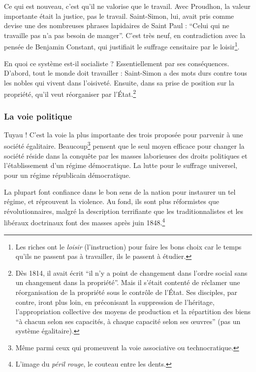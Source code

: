 \documentclass[12pt]{report}
\begin{document}
Ce qui est nouveau, c'est qu'il ne valorise que le travail. Avec Proudhon, la valeur importante était la justice, pas le travail. Saint-Simon, lui, avait pris comme devise une des nombreuses phrases lapidaires de Saint Paul : \enquote{Celui qui ne travaille pas n'a pas besoin de manger}.
C'est très neuf, en contradiction avec la pensée de Benjamin Constant, qui justifiait le suffrage censitaire par le loisir\footnote{Les riches ont le \emph{loisir} (l'instruction) pour faire les bons choix car le temps qu'ils ne passent pas à travailler, ils le passent à étudier.}.

En quoi ce système est-il socialiste ? Essentiellement par ses conséquences. D'abord, tout le monde doit travailler : Saint-Simon a des mots durs contre tous les nobles qui vivent dans l'oisiveté. Ensuite, dans sa prise de position sur la propriété, qu'il veut réorganiser par l'État.\footnote{Dès 1814, il avait écrit \enquote{il n'y a point de changement dans l'ordre social sans un changement dans la propriété}. Mais il s'était contenté de réclamer une réorganisation de la propriété sous le contrôle de l'État. Ses disciples, par contre, iront plus loin, en préconisant la suppression de l'héritage, l'appropriation collective des moyens de production et la répartition des biens \enquote{à chacun selon ses capacités, à chaque capacité selon ses œuvres} (pas un système égalitaire).}

\subsubsection{La voie politique}

Tuyau ! C'est la voie la plus importante des trois proposée pour parvenir à une société égalitaire.
Beaucoup\footnote{Même parmi ceux qui promeuvent la voie associative ou technocratique.} pensent que le seul moyen efficace pour changer la société réside dans la conquête par les masses laborieuses des droits politiques et l'établissement d'un régime démocratique. La lutte pour le suffrage universel, pour un régime républicain démocratique. 

La plupart font confiance dans le bon sens de la nation pour instaurer un tel régime, et réprouvent la violence.
Au fond, ils sont plus réformistes que révolutionnaires, malgré la description terrifiante que les traditionnalistes et les libéraux doctrinaux font des masses après juin 1848.\footnote{L'image du \emph{péril rouge}, le couteau entre les dents.}
\end{document}
